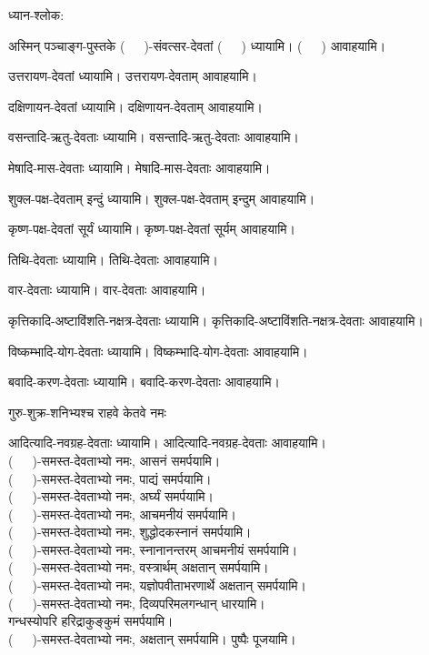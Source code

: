 










ध्यान-श्लोक:


\newcommand{\devataaM}{(~~~)}
\newcommand{\devataam}{(~~~)}
\newcommand{\devataayai}{(~~~)}
\newcommand{\devataadi}{(~~~)}
\newcommand{\yname}{(~~~)}


अस्मिन् पञ्चाङ्ग-पुस्तके \yname-संवत्सर-देवतां \devataaM{} ध्यायामि। \devataam{} आवाहयामि।

उत्तरायण-देवतां ध्यायामि। उत्तरायण-देवताम् आवाहयामि।

दक्षिणायन-देवतां ध्यायामि। दक्षिणायन-देवताम् आवाहयामि।

वसन्तादि-ऋतु-देवताः ध्यायामि। वसन्तादि-ऋतु-देवताः आवाहयामि।

मेषादि-मास-देवताः ध्यायामि। मेषादि-मास-देवताः आवाहयामि।

शुक्ल-पक्ष-देवताम् इन्दुं ध्यायामि। शुक्ल-पक्ष-देवताम् इन्दुम् आवाहयामि।

कृष्ण-पक्ष-देवतां सूर्यं ध्यायामि। कृष्ण-पक्ष-देवतां सूर्यम् आवाहयामि।

तिथि-देवताः ध्यायामि। तिथि-देवताः आवाहयामि।

वार-देवताः ध्यायामि। वार-देवताः आवाहयामि।

कृत्तिकादि-अष्टाविंशति-नक्षत्र-देवताः ध्यायामि। कृत्तिकादि-अष्टाविंशति-नक्षत्र-देवताः आवाहयामि।

विष्कम्भादि-योग-देवताः ध्यायामि। विष्कम्भादि-योग-देवताः आवाहयामि।

बवादि-करण-देवताः ध्यायामि। बवादि-करण-देवताः आवाहयामि।

{गुरु-शुक्र-शनिभ्यश्च राहवे केतवे नमः}

आदित्यादि-नवग्रह-देवताः ध्यायामि। आदित्यादि-नवग्रह-देवताः आवाहयामि।\\
\devataadi-समस्त-देवताभ्यो नमः, आसनं समर्पयामि।\\
\devataadi-समस्त-देवताभ्यो नमः, पाद्यं समर्पयामि।\\
\devataadi-समस्त-देवताभ्यो नमः, अर्घ्यं समर्पयामि।\\
\devataadi-समस्त-देवताभ्यो नमः, आचमनीयं समर्पयामि।\\
\devataadi-समस्त-देवताभ्यो नमः, शुद्धोदकस्नानं समर्पयामि।\\
\devataadi-समस्त-देवताभ्यो नमः, स्नानानन्तरम् आचमनीयं समर्पयामि।\\
\devataadi-समस्त-देवताभ्यो नमः, वस्त्रार्थम् अक्षतान् समर्पयामि।\\
\devataadi-समस्त-देवताभ्यो नमः, यज्ञोपवीताभरणार्थे अक्षतान् समर्पयामि।\\
\devataadi-समस्त-देवताभ्यो नमः, दिव्यपरिमलगन्धान् धारयामि।\\ गन्धस्योपरि हरिद्राकुङ्कुमं समर्पयामि।\\
\devataadi-समस्त-देवताभ्यो नमः, अक्षतान् समर्पयामि। पुष्पैः पूजयामि।\\

